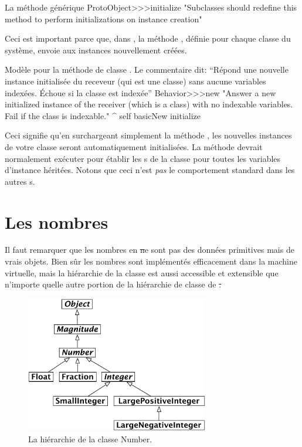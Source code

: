 \documentclass[a4paper,10pt,twoside]{book}
\begin{document}
\begin{method}{La méthode générique }
ProtoObject>>>initialize
   "Subclasses should redefine this method to perform initializations on instance creation"
\end{method}

Ceci est important parce que, dans \pharo, 
 la méthode , définie pour chaque classe du
système, envoie  aux instances nouvellement
créées.

\begin{method}{Modèle pour la méthode de classe . Le commentaire dit: ``Répond une nouvelle instance initialisée du receveur (qui est une classe) sans aucune variables indexées. Échoue si la classe est indexée''}
Behavior>>>new
    "Answer a new initialized instance of the receiver (which is a class) with no indexable variables. Fail if the class is indexable."
    ^ self basicNew initialize
\end{method}

Ceci signifie qu'en surchargeant simplement la méthode  , les nouvelles instances de votre classe seront automatiquement initialisées. La méthode  devrait normalement exécuter  pour établir les s de la classe pour toutes les variables d'instance héritées.
Notons que ceci n'est \emph{pas} le comportement standard dans les autres \st{}s.

\section{Les nombres}
Il faut remarquer que les nombres en \st ne sont pas des données primitives mais de vrais objets. Bien sûr les nombres sont implémentés efficacement dans la machine virtuelle, mais la hiérarchie de la classe  est aussi accessible et extensible que n'importe quelle autre portion de la hiérarchie de classe de \st.

\begin{figure}[ht]
\centerline {\includegraphics[width=8cm]{NumberHierarchy}}
\caption{La hiérarchie de la classe Number.}
\end{figure}
\end{document}
